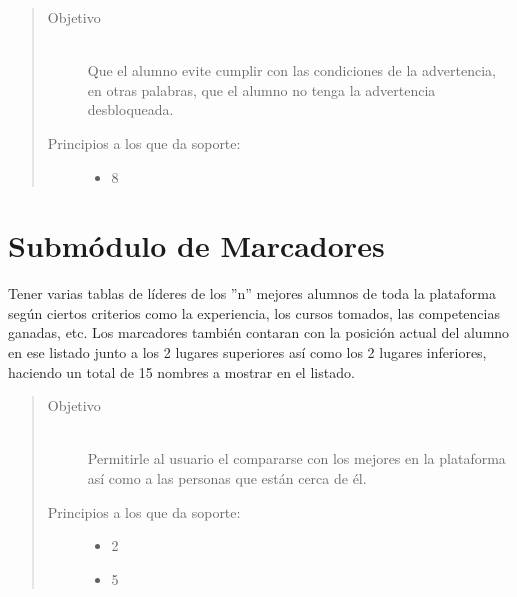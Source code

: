     \begin{quote}
    \begin{description}    
    \item[Objetivo] \hfill\\
        Que el alumno evite cumplir con las condiciones de la advertencia, en otras palabras, que el alumno no tenga la advertencia desbloqueada.
    
    \item[Principios a los que da soporte:] \hfill
        \begin{itemize}
            \item 8 \principioVIII
        \end{itemize}
    \end{description}
    \end{quote}
    
\section{Submódulo de Marcadores}

    Tener varias tablas de líderes de los ''n'' mejores alumnos de toda la plataforma según ciertos criterios como la experiencia, los cursos tomados, las competencias ganadas, etc. Los marcadores también contaran con la posición actual del alumno en ese listado junto a los 2 lugares superiores así como los 2 lugares inferiores, haciendo un total de 15 nombres a mostrar en el listado. 
    
    \begin{quote}
    \begin{description}
    \item[Objetivo] \hfill\\
        Permitirle al usuario el compararse con los mejores en la plataforma así como a las personas que están cerca de él.
    
    \item[Principios a los que da soporte:] \hfill
        \begin{itemize}
            \item 2 \principioII
            \item 5 \principioV
        \end{itemize}
    \end{description}
    \end{quote}
 
\clearpage